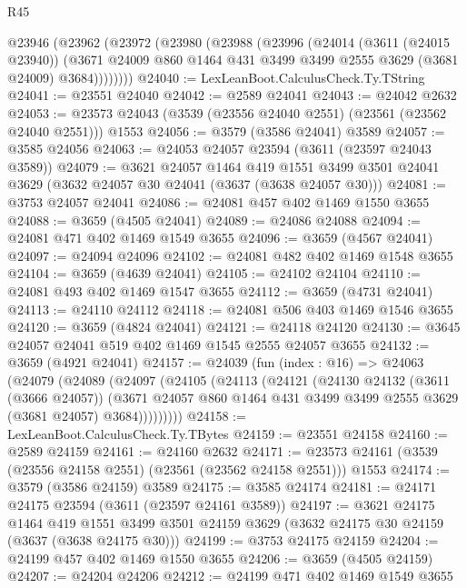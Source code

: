 \begin{lexlean}{R45}
\begin{coremodule}
    @23946
      (@23962
        (@23972
          (@23980
            (@23988
              (@23996
                (@24014
                  (@3611 (@24015 @23940))
                  (@3671 @24009 @860 @1464 @431 @3499 @3499 @2555 @3629 (@3681 @24009) @3684))))))))
@24040 := LexLeanBoot.CalculusCheck.Ty.TString
@24041 := @23551 @24040
@24042 := @2589 @24041
@24043 := @24042 @2632
@24053 := @23573 @24043 (@3539 (@23556 @24040 @2551) (@23561 (@23562 @24040 @2551))) @1553
@24056 := @3579 (@3586 @24041) @3589
@24057 := @3585 @24056
@24063 := @24053 @24057 @23594 (@3611 (@23597 @24043 @3589))
@24079 := @3621
    @24057
    @1464
    @419
    @1551
    @3499
    @3501
    @24041
    @3629
    (@3632 @24057 @30 @24041 (@3637 (@3638 @24057 @30)))
@24081 := @3753 @24057 @24041
@24086 := @24081 @457 @402 @1469 @1550 @3655
@24088 := @3659 (@4505 @24041)
@24089 := @24086 @24088
@24094 := @24081 @471 @402 @1469 @1549 @3655
@24096 := @3659 (@4567 @24041)
@24097 := @24094 @24096
@24102 := @24081 @482 @402 @1469 @1548 @3655
@24104 := @3659 (@4639 @24041)
@24105 := @24102 @24104
@24110 := @24081 @493 @402 @1469 @1547 @3655
@24112 := @3659 (@4731 @24041)
@24113 := @24110 @24112
@24118 := @24081 @506 @403 @1469 @1546 @3655
@24120 := @3659 (@4824 @24041)
@24121 := @24118 @24120
@24130 := @3645 @24057 @24041 @519 @402 @1469 @1545 @2555 @24057 @3655
@24132 := @3659 (@4921 @24041)
@24157 := @24039
    (fun (index : @16) =>
    @24063
      (@24079
        (@24089
          (@24097
            (@24105
              (@24113
                (@24121
                  (@24130
                    @24132
                    (@3611 (@3666 @24057))
                    (@3671
                      @24057
                      @860
                      @1464
                      @431
                      @3499
                      @3499
                      @2555
                      @3629
                      (@3681 @24057)
                      @3684)))))))))
@24158 := LexLeanBoot.CalculusCheck.Ty.TBytes
@24159 := @23551 @24158
@24160 := @2589 @24159
@24161 := @24160 @2632
@24171 := @23573 @24161 (@3539 (@23556 @24158 @2551) (@23561 (@23562 @24158 @2551))) @1553
@24174 := @3579 (@3586 @24159) @3589
@24175 := @3585 @24174
@24181 := @24171 @24175 @23594 (@3611 (@23597 @24161 @3589))
@24197 := @3621
    @24175
    @1464
    @419
    @1551
    @3499
    @3501
    @24159
    @3629
    (@3632 @24175 @30 @24159 (@3637 (@3638 @24175 @30)))
@24199 := @3753 @24175 @24159
@24204 := @24199 @457 @402 @1469 @1550 @3655
@24206 := @3659 (@4505 @24159)
@24207 := @24204 @24206
@24212 := @24199 @471 @402 @1469 @1549 @3655

\end{coremodule}
\end{lexlean}
